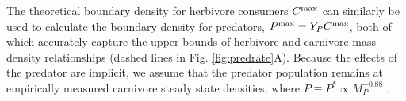 \documentclass[11pt]{article}
\begin{document}
The theoretical boundary density for herbivore consumers $C^{\rm max}$ can similarly be used to calculate the boundary density for predators, $P^{\rm max} = Y_P C^{\rm max}$, both of which accurately capture the upper-bounds of herbivore and carnivore mass-density relationships (dashed lines in Fig. \ref{fig:predrate}A).
Because the effects of the predator are implicit, we assume that the predator population remains at empirically measured carnivore steady state densities, where $P\equiv P^*\propto M_P^{-0.88}$ \citep{carbone2002common}.  





\end{document}
